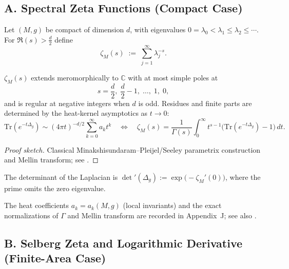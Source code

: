 \subsection*{A. Spectral Zeta Functions (Compact Case)}
\label{subsec:spectral-zeta}

\begin{definition}
\label{def:spec-zeta}
Let $(M,g)$ be compact of dimension $d$, with eigenvalues $0=\lambda_0<\lambda_1\le\lambda_2\le\cdots$. For $\Re(s)>\frac d2$ define
\[
  \zeta_M(s) \;:=\; \sum_{j=1}^\infty \lambda_j^{-s}.
\]
\end{definition}

\begin{theorem}
\label{thm:spec-zeta-cont}
$\zeta_M(s)$ extends meromorphically to $\mathbb C$ with at most simple poles at
\[
  s=\frac d2,\;\frac d2-1,\;\ldots,\;1,\;0,
\]
and is regular at negative integers when $d$ is odd. Residues and finite parts are determined by the heat-kernel asymptotics as $t\to0$:
\[
  \mathrm{Tr}(e^{-t\Delta_g}) \sim (4\pi t)^{-d/2}\sum_{k=0}^{\infty} a_k t^k
  \quad\Longleftrightarrow\quad
  \zeta_M(s)=\frac1{\Gamma(s)}\int_0^\infty t^{s-1}\big(\mathrm{Tr}(e^{-t\Delta_g})-1\big)\,dt.
\]
\end{theorem}

\begin{proof}[Proof sketch]
Classical Minakshisundaram–Pleijel/Seeley parametrix construction and Mellin transform; see \cite{Minakshisundaram1949,Seeley1967}.
\end{proof}

\begin{definition}
\label{def:zeta-det}
The determinant of the Laplacian is $\det{}'(\Delta_g):=\exp\!\big(-\zeta_M'(0)\big)$, where the prime omits the zero eigenvalue.
\end{definition}

\begin{remark}
The heat coefficients $a_k=a_k(M,g)$ (local invariants) and the exact normalizations of $\Gamma$ and Mellin transform are recorded in Appendix~J; see also \cite{Hormander1968}.
\end{remark}


\subsection*{B. Selberg Zeta and Logarithmic Derivative (Finite-Area Case)}
\label{subsec:selberg-zeta}

